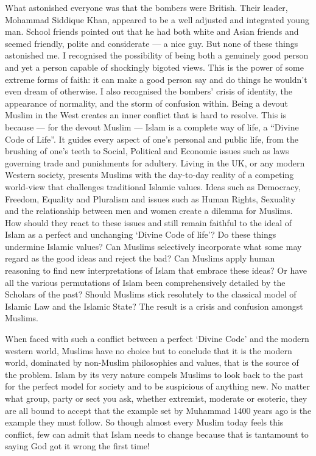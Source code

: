 \documentclass[12pt]{memoir}
\begin{document}
What astonished everyone was that the bombers were British.
Their leader, Mohammad Siddique Khan,
appeared to be a well adjusted and integrated young man.
School friends pointed out that he had both white and Asian friends
and seemed friendly, polite and considerate — a nice guy.
But none of these things astonished me.
I recognised the possibility of being both a genuinely good person
and yet a person capable of shockingly bigoted views.
This is the power of some extreme forms of faith:
it can make a good person say and do things
he wouldn’t even dream of otherwise.
I also recognised the bombers’ crisis of identity,
the appearance of normality, and the storm of confusion within.
Being a devout Muslim in the West creates an inner conflict
that is hard to resolve.
This is because — for the devout Muslim —
Islam is a complete way of life, a “Divine Code of Life”.
It guides every aspect of one’s personal and public life,
from the brushing of one’s teeth to Social, Political and Economic issues
such as laws governing trade 
and punishments for adultery.
Living in the UK, or any modern Western society, presents Muslims with
the day-to-day reality of a competing world-view
that challenges traditional Islamic values.
Ideas such as Democracy, Freedom, Equality and Pluralism
and issues such as Human Rights, Sexuality and the relationship
between men and women create a dilemma for Muslims.
How should they react to these issues and still remain faithful
to the ideal of Islam as a perfect and unchanging ‘Divine Code of life’?
Do these things undermine Islamic values?
Can Muslims selectively incorporate what some may regard
as the good ideas and reject the bad?
Can Muslims apply human reasoning to find new interpretations of Islam
that embrace these ideas?
Or have all the various permutations of Islam
been comprehensively detailed by the Scholars of the past?
Should Muslims stick resolutely to the classical model
of Islamic Law and the Islamic State?
The result is a crisis and confusion amongst Muslims.

When faced with such a conflict between a perfect ‘Divine Code’
and the modern western world, Muslims have no choice
but to conclude that it is the modern world,
dominated by non-Muslim philosophies and values,
that is the source of the problem.
Islam by its very nature compels Muslims to look back to the past
for the perfect model for society and to be suspicious of anything new.
No matter what group, party or sect you ask, whether extremist,
moderate or esoteric, they are all bound to accept that the example
set by Muhammad 1400 years ago is the example they must follow.
So though almost every Muslim today feels this conflict,
few can admit that Islam needs to change because
that is tantamount to saying God got it wrong the first time!
\end{document}
